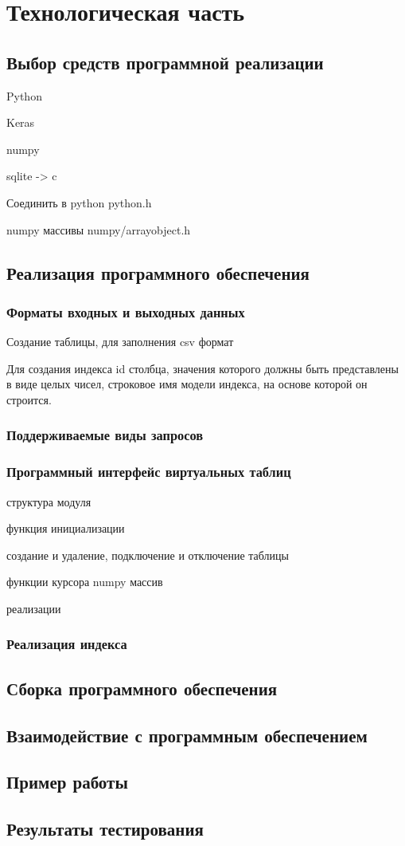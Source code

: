 \chapter{\label{impl}Технологическая часть}

\section{Выбор средств программной реализации}

Python

Keras

numpy

sqlite -> c

Соединить в python python.h

numpy массивы  numpy/arrayobject.h

\section{Реализация программного обеспечения}

\subsection{Форматы входных и выходных данных}

Создание таблицы, для заполнения csv формат

Для создания индекса id столбца, значения которого должны быть представлены в
виде целых чисел, строковое имя модели индекса, на основе которой он строится.

\subsection{Поддерживаемые виды запросов}

\subsection{Программный интерфейс виртуальных таблиц}

структура модуля

функция инициализации

создание и удаление, подключение и отключение таблицы

функции курсора numpy массив

реализации

\subsection{Реализация индекса}

\section{Сборка программного обеспечения}

\section{Взаимодействие с программным обеспечением}

\section{Пример работы}

\section{Результаты тестирования}
